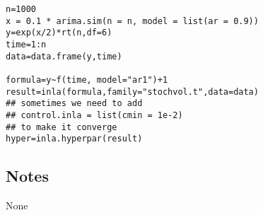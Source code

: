 \documentclass[a4paper,11pt]{article}
\begin{document}
\begin{verbatim}
n=1000
x = 0.1 * arima.sim(n = n, model = list(ar = 0.9))
y=exp(x/2)*rt(n,df=6)
time=1:n
data=data.frame(y,time)

formula=y~f(time, model="ar1")+1
result=inla(formula,family="stochvol.t",data=data)
## sometimes we need to add
## control.inla = list(cmin = 1e-2)
## to make it converge
hyper=inla.hyperpar(result)
\end{verbatim}

\subsection*{Notes}

None
\end{document}
